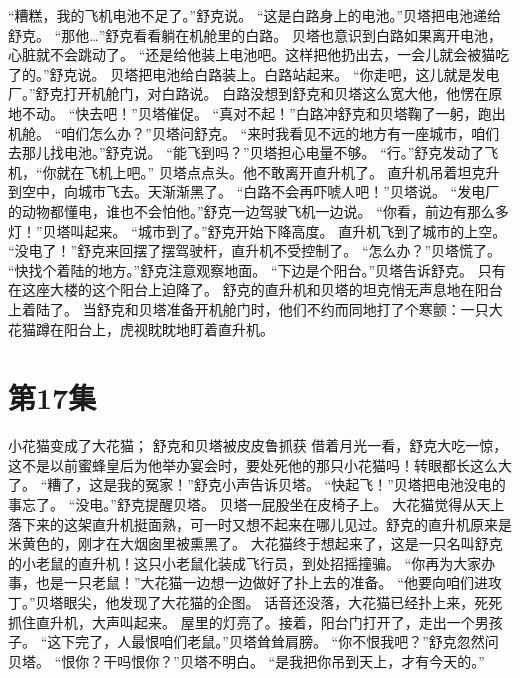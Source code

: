 \documentclass[a4paper,12pt,UTF8,twoside]{ctexbook}
\begin{document}
        “糟糕，我的飞机电池不足了。”舒克说。 
        “这是白路身上的电池。”贝塔把电池递给舒克。 
        “那他…”舒克看看躺在机舱里的白路。 
        贝塔也意识到白路如果离开电池，心脏就不会跳动了。 
        “还是给他装上电池吧。这样把他扔出去，一会儿就会被猫吃了的。”舒克说。 
        贝塔把电池给白路装上。白路站起来。 
        “你走吧，这儿就是发电厂。”舒克打开机舱门，对白路说。 
        白路没想到舒克和贝塔这么宽大他，他愣在原地不动。 
        “快去吧！”贝塔催促。 
        “真对不起！”白路冲舒克和贝塔鞠了一躬，跑出机舱。 
        “咱们怎么办？”贝塔问舒克。 
        “来时我看见不远的地方有一座城市，咱们去那儿找电池。”舒克说。 
        “能飞到吗？”贝塔担心电量不够。 
        “行。”舒克发动了飞机，“你就在飞机上吧。” 
        贝塔点点头。他不敢离开直升机了。 
        直升机吊着坦克升到空中，向城市飞去。天渐渐黑了。 
        “白路不会再吓唬人吧！”贝塔说。 
        “发电厂的动物都懂电，谁也不会怕他。”舒克一边驾驶飞机一边说。 
        “你看，前边有那么多灯！”贝塔叫起来。 
        “城市到了。”舒克开始下降高度。 
        直升机飞到了城市的上空。 
        “没电了！”舒克来回摆了摆驾驶杆，直升机不受控制了。 
        “怎么办？”贝塔慌了。 
        “快找个着陆的地方。”舒克注意观察地面。 
        “下边是个阳台。”贝塔告诉舒克。 
        只有在这座大楼的这个阳台上迫降了。 
        舒克的直升机和贝塔的坦克悄无声息地在阳台上着陆了。 
        当舒克和贝塔准备开机舱门时，他们不约而同地打了个寒颤：一只大花猫蹲在阳台上，虎视眈眈地盯着直升机。   \chapter{第17集}   
        小花猫变成了大花猫； 
        舒克和贝塔被皮皮鲁抓获   
        借着月光一看，舒克大吃一惊，这不是以前蜜蜂皇后为他举办宴会时，要处死他的那只小花猫吗！转眼都长这么大了。 
        “糟了，这是我的冤家！”舒克小声告诉贝塔。 
        “快起飞！”贝塔把电池没电的事忘了。 
        “没电。”舒克提醒贝塔。 
        贝塔一屁股坐在皮椅子上。 
        大花猫觉得从天上落下来的这架直升机挺面熟，可一时又想不起来在哪儿见过。舒克的直升机原来是米黄色的，刚才在大烟囱里被熏黑了。 
        大花猫终于想起来了，这是一只名叫舒克的小老鼠的直升机！这只小老鼠化装成飞行员，到处招摇撞骗。 
        “你再为大家办事，也是一只老鼠！”大花猫一边想一边做好了扑上去的准备。 
        “他要向咱们进攻丁。”贝塔眼尖，他发现了大花猫的企图。 
        话音还没落，大花猫已经扑上来，死死抓住直升机，大声叫起来。 
        屋里的灯亮了。接着，阳台门打开了，走出一个男孩子。 
        “这下完了，人最恨咱们老鼠。”贝塔耸耸肩膀。 
        “你不恨我吧？”舒克忽然问贝塔。 
        “恨你？干吗恨你？”贝塔不明白。 
        “是我把你吊到天上，才有今天的。” 
\end{document}
